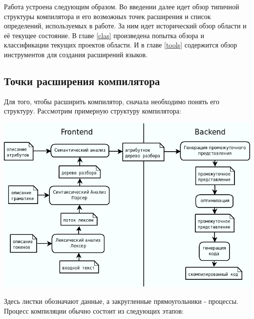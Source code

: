\documentclass[a4paper,12pt]{article}
\begin{document}
Работа устроена следующим образом. Во введении далее идет обзор типичной
структуры компилятора и его возможных точек расширения и список определений,
используемых в работе. За ним идет исторический обзор области и её текущее
состояние. В главе \ref{clas} произведена попытка обзора и классификации текущих
проектов области. И в главе \ref{tools} содержится обзор инструментов для
создания расширений языков.

\subsection{Точки расширения компилятора}
Для того, чтобы расширить компилятор, сначала необходимо понять его структуру.
Рассмотрим примерную структуру компилятора:
\begin{center}
 \includegraphics[scale=0.6]{img/compiler2.png}
\end{center}
Здесь листки обозначают данные, а закругленные прямоугольники - процессы.
\newline \newline
Процесс компиляции обычно состоит из следующих этапов:
\end{document}

